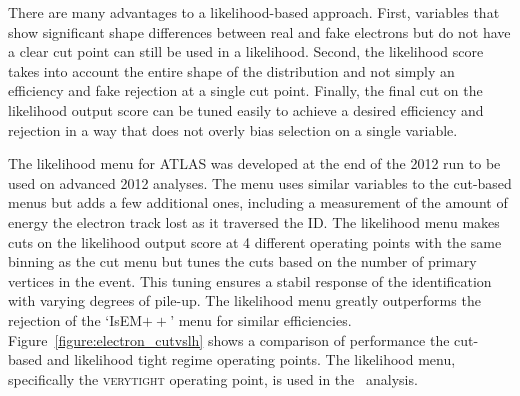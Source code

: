 There are many advantages to a likelihood-based approach. First, variables that show significant shape differences between real and fake electrons but do not have a clear cut point can still be used in a likelihood. Second, the likelihood score takes into account the entire shape of the distribution and not simply an efficiency and fake rejection at a single cut point. Finally, the final cut on the likelihood output score can be tuned easily to achieve a desired efficiency and rejection in a way that does not overly bias selection on a single variable. 

The likelihood menu for ATLAS was developed at the end of the 2012 run to be used on advanced 2012 analyses. The menu uses similar variables to the cut-based menus but adds a few additional ones, including a measurement of the amount of energy the electron track lost as it traversed the ID. The likelihood menu makes cuts on the likelihood output score at 4 different operating points with the same binning as the cut menu but tunes the cuts based on the number of primary vertices in the event. This tuning ensures a stabil response of the identification with varying degrees of pile-up. The likelihood menu greatly outperforms the rejection of the `IsEM$++$' menu for similar efficiencies. Figure~\ref{figure:electron_cutvslh} shows a comparison of performance the cut-based and likelihood tight regime operating points. The likelihood menu, specifically the \textsc{verytight} operating point, is used in the \tth\ analysis.  

